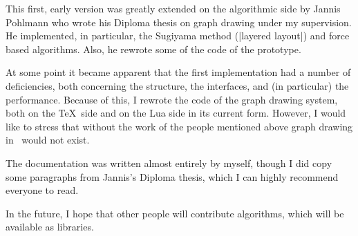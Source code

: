 This first, early version was greatly extended on the algorithmic side
by Jannis Pohlmann who wrote his Diploma thesis on graph drawing under
my supervision. He implemented, in particular, the Sugiyama method
(|layered layout|) and force based algorithms. Also, he rewrote some
of the code of the prototype.

At some point it became apparent that the first implementation had a
number of deficiencies, both concerning the structure, the interfaces,
and (in particular) the performance. Because of this, I rewrote 
the code of the graph drawing system, both on the \TeX\ side
and on the Lua side in its current form. However, I would like to
stress that without the work of the people mentioned above graph
drawing in \tikzname\ would not exist.

The documentation was written almost entirely by myself, though I did
copy some paragraphs from Jannis's Diploma thesis, which I can highly
recommend everyone to read. 

In the future, I hope that other people will contribute algorithms,
which will be available as libraries.